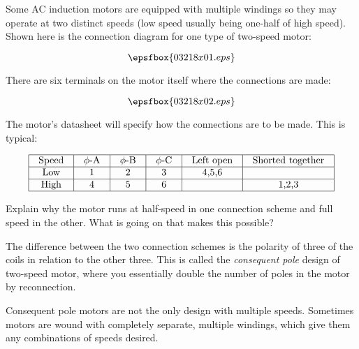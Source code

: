 

Some AC induction motors are equipped with multiple windings so they may operate at two distinct speeds (low speed usually being one-half of high speed).  Shown here is the connection diagram for one type of two-speed motor:

$$\epsfbox{03218x01.eps}$$

There are six terminals on the motor itself where the connections are made:

$$\epsfbox{03218x02.eps}$$

The motor's datasheet will specify how the connections are to be made.  This is typical:


$$\vbox{\offinterlineskip
\halign{\strut
\vrule \quad\hfil # \ \hfil & 
\vrule \quad\hfil # \ \hfil & 
\vrule \quad\hfil # \ \hfil & 
\vrule \quad\hfil # \ \hfil & 
\vrule \quad\hfil # \ \hfil & 
\vrule \quad\hfil # \ \hfil \vrule \cr
\noalign{\hrule}
%
Speed & $\phi$-A & $\phi$-B & $\phi$-C & Left open & Shorted together \cr
%
\noalign{\hrule}
%
Low & 1 & 2 & 3 & 4,5,6 &  \cr
%
\noalign{\hrule}
%
High & 4 & 5 & 6 &  & 1,2,3 \cr
%
\noalign{\hrule}
} %
}$$ %

Explain why the motor runs at half-speed in one connection scheme and full speed in the other.  What is going on that makes this possible?







The difference between the two connection schemes is the polarity of three of the coils in relation to the other three.  This is called the {\it consequent pole} design of two-speed motor, where you essentially double the number of poles in the motor by reconnection.







Consequent pole motors are not the only design with multiple speeds.  Sometimes motors are wound with completely separate, multiple windings, which give them any combinations of speeds desired.




